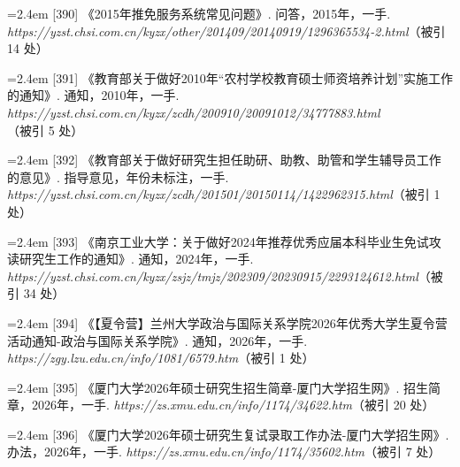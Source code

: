 {\nopagebreak\vspace{1pt}
\noindent\hangindent=2.4em \label{src:S0523}{\color{cAccent}[390]} 《2015年推免服务系统常见问题》. 问答，2015年，一手. \textit{https://yzst.chsi.com.cn/kyzx/other/201409/20140919/1296365534-2.html}（被引 14 处）\par
\vspace{0.6pt}
\noindent\hangindent=2.4em \label{src:S0525}{\color{cAccent}[391]} 《教育部关于做好2010年“农村学校教育硕士师资培养计划”实施工作的通知》. 通知，2010年，一手. \textit{https://yzst.chsi.com.cn/kyzx/zcdh/200910/20091012/34777883.html}（被引 5 处）\par
\vspace{0.6pt}
\noindent\hangindent=2.4em \label{src:S0526}{\color{cAccent}[392]} 《教育部关于做好研究生担任助研、助教、助管和学生辅导员工作的意见》. 指导意见，年份未标注，一手. \textit{https://yzst.chsi.com.cn/kyzx/zcdh/201501/20150114/1422962315.html}（被引 1 处）\par
\vspace{0.6pt}
\noindent\hangindent=2.4em \label{src:S0527}{\color{cAccent}[393]} 《南京工业大学：关于做好2024年推荐优秀应届本科毕业生免试攻读研究生工作的通知》. 通知，2024年，一手. \textit{https://yzst.chsi.com.cn/kyzx/zsjz/tmjz/202309/20230915/2293124612.html}（被引 34 处）\par
\vspace{0.6pt}
\vspace{3.5pt}\par
\nopagebreak\vspace{1pt}
\noindent\hangindent=2.4em \label{src:S0528}{\color{cAccent}[394]} 《【夏令营】兰州大学政治与国际关系学院2026年优秀大学生夏令营活动通知-政治与国际关系学院》. 通知，2026年，一手. \textit{https://zgy.lzu.edu.cn/info/1081/6579.htm}（被引 1 处）\par
\vspace{0.6pt}
\vspace{3.5pt}\par
\nopagebreak\vspace{1pt}
\noindent\hangindent=2.4em \label{src:S0529}{\color{cAccent}[395]} 《厦门大学2026年硕士研究生招生简章-厦门大学招生网》. 招生简章，2026年，一手. \textit{https://zs.xmu.edu.cn/info/1174/34622.htm}（被引 20 处）\par
\vspace{0.6pt}
\noindent\hangindent=2.4em \label{src:S0530}{\color{cAccent}[396]} 《厦门大学2026年硕士研究生复试录取工作办法-厦门大学招生网》. 办法，2026年，一手. \textit{https://zs.xmu.edu.cn/info/1174/35602.htm}（被引 7 处）\par
}
